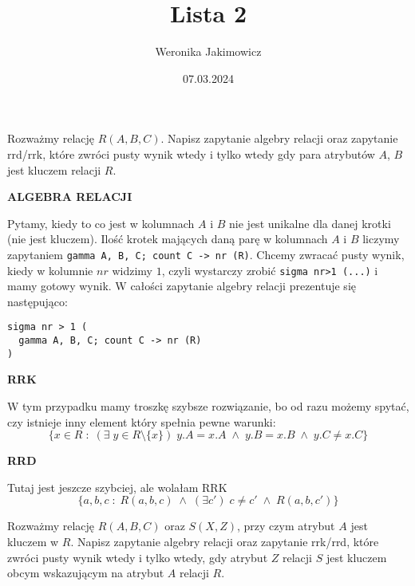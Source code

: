 \documentclass{article}
\title{Lista 2}
\author{Weronika Jakimowicz}
\date{07.03.2024}
\begin{document}
\maketitle

\begin{problem}
  Rozważmy relację $R(A, B, C)$. Napisz zapytanie algebry relacji oraz zapytanie rrd/rrk, które zwróci pusty wynik wtedy i tylko wtedy gdy para atrybutów $A$, $B$ jest kluczem relacji $R$.
\end{problem}

\begin{solution}
  \textbf{\color{green}ALGEBRA RELACJI}

  Pytamy, kiedy to co jest w kolumnach $A$ i $B$ nie jest unikalne dla danej krotki (nie jest kluczem). Ilość krotek mających daną parę w kolumnach $A$ i $B$ liczymy zapytaniem \lstinline{gamma A, B, C; count C -> nr (R)}. Chcemy zwracać pusty wynik, kiedy w kolumnie $nr$ widzimy $1$, czyli wystarczy zrobić \lstinline{sigma nr>1 (...)} i mamy gotowy wynik. W całości zapytanie algebry relacji prezentuje się następująco:
  \begin{lstlisting}
sigma nr > 1 (
  gamma A, B, C; count C -> nr (R)
)
  \end{lstlisting}

  \textbf{\color{green}RRK}
  
  W tym przypadku mamy troszkę szybsze rozwiązanie, bo od razu możemy spytać, czy istnieje inny element który spełnia pewne warunki:
  $$\{x\in R\;:\;(\exists\;y\in R\setminus\{x\})\;y.A=x.A\;\land\; y.B=x.B\;\land\;y.C\neq x.C\}$$
  
  \textbf{\color{green}RRD}
  
  Tutaj jest jeszcze szybciej, ale wolałam RRK
  $$\{a,b,c\;:\;R(a,b,c)\;\land\;(\exists c')\;c\neq c'\;\land\;R(a, b, c')\}$$
\end{solution}

\begin{problem}
  Rozważmy relację $R(A, B, C)$ oraz $S(X, Z)$, przy czym atrybut $A$ jest kluczem w $R$. Napisz zapytanie algebry relacji oraz zapytanie rrk/rrd, które zwróci pusty wynik wtedy i tylko wtedy, gdy atrybut $Z$ relacji $S$ jest kluczem obcym wskazującym na atrybut $A$ relacji $R$.
\end{problem}
\end{document}
